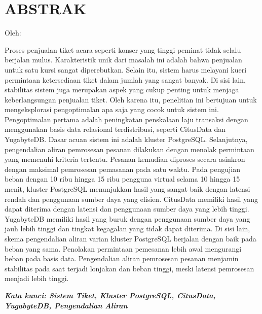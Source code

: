 \clearpage
\chapter*{ABSTRAK}
\begin{center}
  \center
  \begin{singlespace}
    \large\bfseries\MakeUppercase{\thetitle}

    \normalfont\normalsize
    Oleh:

    \bfseries \theauthor
  \end{singlespace}
\end{center}

\begin{singlespace}
  \small
  Proses penjualan tiket acara seperti konser yang tinggi peminat tidak selalu berjalan mulus. Karakteristik unik dari masalah ini adalah bahwa penjualan untuk satu kursi sangat diperebutkan. Selain itu, sistem harus melayani kueri permintaan ketersediaan tiket dalam jumlah yang sangat banyak. Di sisi lain, stabilitas sistem juga merupakan aspek yang cukup penting untuk menjaga keberlangsungan penjualan tiket. Oleh karena itu, penelitian ini bertujuan untuk mengeksplorasi pengoptimalan apa saja yang cocok untuk sistem ini. Pengoptimalan pertama adalah peningkatan penskalaan laju transaksi dengan menggunakan basis data relasional terdistribusi, seperti CitusData dan YugabyteDB. Dasar acuan sistem ini adalah kluster PostgreSQL. Selanjutnya, pengendalian aliran pemrosesan pesanan dilakukan dengan menolak permintaan yang memenuhi kriteria tertentu. Pesanan kemudian diproses secara asinkron dengan maksimal pemrosesan pemasanan pada satu waktu. Pada pengujian beban dengan 10 ribu hingga 15 ribu pengguna virtual selama 10 hingga 15 menit, kluster PostgreSQL menunjukkan hasil yang sangat baik dengan latensi rendah dan penggunaan sumber daya yang efisien. CitusData memiliki hasil yang dapat diterima dengan latensi dan penggunaan sumber daya yang lebih tinggi. YugabyteDB memiliki hasil yang buruk dengan penggunaan sumber daya yang jauh lebih tinggi dan tingkat kegagalan yang tidak dapat diterima. Di sisi lain, skema pengendalian aliran varian kluster PostgreSQL berjalan dengan baik pada beban yang sama. Penolakan permintaan pemesanan lebih awal mengurangi beban pada basis data. Pengendalian aliran pemrosesan pesanan menjamin stabilitas pada saat terjadi lonjakan dan beban tinggi, meski latensi pemrosesan menjadi lebih tinggi.

  \textbf{\textit{Kata kunci: Sistem Tiket, Kluster PostgreSQL, CitusData, YugabyteDB, Pengendalian Aliran}}

\end{singlespace}
\clearpage